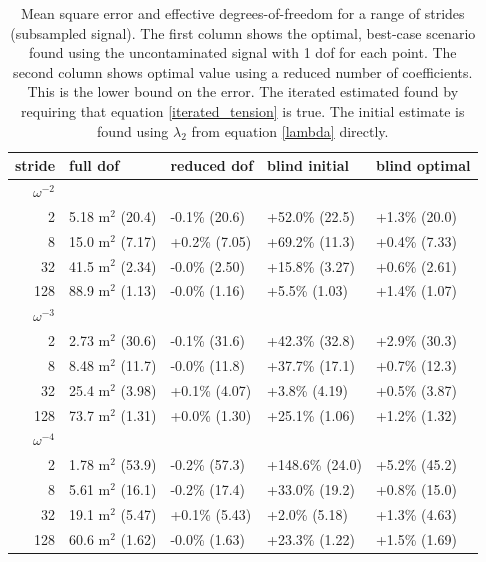\documentclass[10pt,journal]{IEEEtran}
\begin{document}
\begin{table}[ht]
\caption{Mean square error and effective degrees-of-freedom for a range of strides (subsampled signal). The first column shows the optimal, best-case scenario found using the uncontaminated signal with 1 dof for each point. The second column shows optimal value using a reduced number of coefficients. This is the lower bound on the error. The iterated estimated found by requiring that equation \ref{iterated_tension} is true. The initial estimate is found using $\lambda_2$ from equation \ref{lambda} directly. }
\label{fit_results}
\centering
\begin{tabular}{r | llll} stride & full dof & reduced dof & blind initial & blind optimal \\ \hline \hline 
$\omega^{-2}$ &&&&  \\ \hline 
2 & 5.18 m$^2$ (20.4) &  -0.1\% (20.6) &  +52.0\% (22.5) &  +1.3\% (20.0) \\ 
8 & 15.0 m$^2$ (7.17) &  +0.2\% (7.05) &  +69.2\% (11.3) &  +0.4\% (7.33) \\ 
32 & 41.5 m$^2$ (2.34) &  -0.0\% (2.50) &  +15.8\% (3.27) &  +0.6\% (2.61) \\ 
128 & 88.9 m$^2$ (1.13) &  -0.0\% (1.16) &  +5.5\% (1.03) &  +1.4\% (1.07) \\ 
$\omega^{-3}$ &&&&  \\ \hline 
2 & 2.73 m$^2$ (30.6) &  -0.1\% (31.6) &  +42.3\% (32.8) &  +2.9\% (30.3) \\ 
8 & 8.48 m$^2$ (11.7) &  -0.0\% (11.8) &  +37.7\% (17.1) &  +0.7\% (12.3) \\ 
32 & 25.4 m$^2$ (3.98) &  +0.1\% (4.07) &  +3.8\% (4.19) &  +0.5\% (3.87) \\ 
128 & 73.7 m$^2$ (1.31) &  +0.0\% (1.30) &  +25.1\% (1.06) &  +1.2\% (1.32) \\ 
$\omega^{-4}$ &&&&  \\ \hline 
2 & 1.78 m$^2$ (53.9) &  -0.2\% (57.3) &  +148.6\% (24.0) &  +5.2\% (45.2) \\ 
8 & 5.61 m$^2$ (16.1) &  -0.2\% (17.4) &  +33.0\% (19.2) &  +0.8\% (15.0) \\ 
32 & 19.1 m$^2$ (5.47) &  +0.1\% (5.43) &  +2.0\% (5.18) &  +1.3\% (4.63) \\ 
128 & 60.6 m$^2$ (1.62) &  -0.0\% (1.63) &  +23.3\% (1.22) &  +1.5\% (1.69) \\ 
\end{tabular} 

\end{table}
\end{document}
